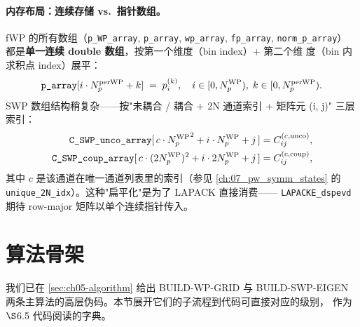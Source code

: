 \paragraph{内存布局：连续存储 vs.~指针数组。}
fWP 的所有数组（\texttt{p\_WP\_array}, \texttt{p\_array},
\texttt{wp\_array}, \texttt{fp\_array}, \texttt{norm\_p\_array}）
都是\textbf{单一连续 double 数组}，按第一个维度（bin index）+ 第二个维
度（bin 内求积点 index）展平：
\begin{equation}
\texttt{p\_array}[i \cdot N_p^{\rm per WP} + k]
\;=\;
p_i^{(k)},
\quad i \in [0, {N_{p}^{\text{WP}}}),\;k \in [0, N_p^{\rm per WP}).
\end{equation}
SWP 数组结构稍复杂——按"未耦合 / 耦合 + 2N 通道索引 + 矩阵元 (i, j)" 三层
索引：
\begin{align}
\texttt{C\_SWP\_unco\_array}[\,c \cdot {N_{p}^{\text{WP}}}^2 + i \cdot {N_{p}^{\text{WP}}} + j\,]
   &= C_{ij}^{(c, \text{unco})}, \\
\texttt{C\_SWP\_coup\_array}[\,c \cdot (2{N_{p}^{\text{WP}}})^2 + i \cdot 2{N_{p}^{\text{WP}}} + j\,]
   &= C_{ij}^{(c, \text{coup})},
\end{align}
其中 \(c\) 是该通道在唯一通道列表里的索引（参见 \cref{ch:07_pw_symm_states}
的 \texttt{unique\_2N\_idx}）。这种"扁平化"是为了 LAPACK 直接消费——
\texttt{LAPACKE\_dspevd} 期待 row-major 矩阵以单个连续指针传入。

\section{算法骨架}
\label{sec:ch06-algorithm}

我们已在 \cref{sec:ch05-algorithm} 给出 BUILD-WP-GRID 与 BUILD-SWP-EIGEN
两条主算法的高层伪码。本节展开它们的子流程到代码可直接对应的级别，
作为 \(\S\)6.5 代码阅读的字典。

